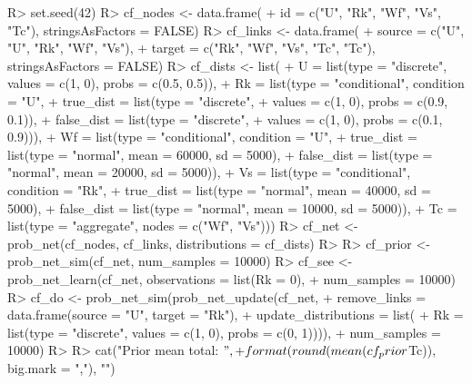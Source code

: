 \documentclass[
]{jss}
\begin{document}
\begin{CodeChunk}
\begin{CodeInput}
R> set.seed(42)
R> cf_nodes <- data.frame(
+   id = c("U", "Rk", "Wf", "Vs", "Tc"), stringsAsFactors = FALSE)
R> cf_links <- data.frame(
+   source = c("U", "U", "Rk", "Wf", "Vs"),
+   target = c("Rk", "Wf", "Vs", "Tc", "Tc"), stringsAsFactors = FALSE)
R> cf_dists <- list(
+   U  = list(type = "discrete", values = c(1, 0), probs = c(0.5, 0.5)),
+   Rk = list(type = "conditional", condition = "U",
+     true_dist  = list(type = "discrete",
+       values = c(1, 0), probs = c(0.9, 0.1)),
+     false_dist = list(type = "discrete",
+       values = c(1, 0), probs = c(0.1, 0.9))),
+   Wf = list(type = "conditional", condition = "U",
+     true_dist  = list(type = "normal", mean = 60000, sd = 5000),
+     false_dist = list(type = "normal", mean = 20000, sd = 5000)),
+   Vs = list(type = "conditional", condition = "Rk",
+     true_dist  = list(type = "normal", mean = 40000, sd = 5000),
+     false_dist = list(type = "normal", mean = 10000, sd = 5000)),
+   Tc = list(type = "aggregate", nodes = c("Wf", "Vs")))
R> cf_net <- prob_net(cf_nodes, cf_links, distributions = cf_dists)
R> 
R> cf_prior <- prob_net_sim(cf_net, num_samples = 10000)
R> cf_see   <- prob_net_learn(cf_net, observations = list(Rk = 0),
+                            num_samples = 10000)
R> cf_do    <- prob_net_sim(prob_net_update(cf_net,
+   remove_links = data.frame(source = "U", target = "Rk"),
+   update_distributions = list(
+     Rk = list(type = "discrete", values = c(1, 0), probs = c(0, 1)))),
+   num_samples = 10000)
R> 
R> cat("Prior mean total:        $",
+     format(round(mean(cf_prior$Tc)), big.mark = ","), "\n")
\end{CodeInput}
\end{CodeChunk}
\end{document}
